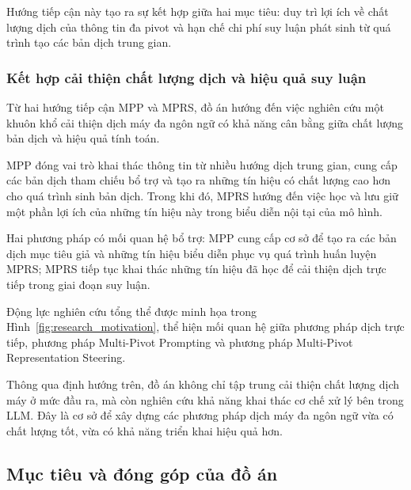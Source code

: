 Hướng tiếp cận này tạo ra sự kết hợp giữa hai mục tiêu: duy trì lợi ích về chất lượng dịch của thông tin đa pivot và hạn chế chi phí suy luận phát sinh từ quá trình tạo các bản dịch trung gian.

\subsubsection{Kết hợp cải thiện chất lượng dịch và hiệu quả suy luận}

Từ hai hướng tiếp cận MPP và MPRS, đồ án hướng đến việc nghiên cứu một khuôn khổ cải thiện dịch máy đa ngôn ngữ có khả năng cân bằng giữa chất lượng bản dịch và hiệu quả tính toán.

MPP đóng vai trò khai thác thông tin từ nhiều hướng dịch trung gian, cung cấp các bản dịch tham chiếu bổ trợ và tạo ra những tín hiệu có chất lượng cao hơn cho quá trình sinh bản dịch. Trong khi đó, MPRS hướng đến việc học và lưu giữ một phần lợi ích của những tín hiệu này trong biểu diễn nội tại của mô hình.

Hai phương pháp có mối quan hệ bổ trợ: MPP cung cấp cơ sở để tạo ra các bản dịch mục tiêu giả và những tín hiệu biểu diễn phục vụ quá trình huấn luyện MPRS; MPRS tiếp tục khai thác những tín hiệu đã học để cải thiện dịch trực tiếp trong giai đoạn suy luận.

Động lực nghiên cứu tổng thể được minh họa trong Hình~\ref{fig:research_motivation}, thể hiện mối quan hệ giữa phương pháp dịch trực tiếp, phương pháp Multi-Pivot Prompting và phương pháp Multi-Pivot Representation Steering.


Thông qua định hướng trên, đồ án không chỉ tập trung cải thiện chất lượng dịch máy ở mức đầu ra, mà còn nghiên cứu khả năng khai thác cơ chế xử lý bên trong LLM. Đây là cơ sở để xây dựng các phương pháp dịch máy đa ngôn ngữ vừa có chất lượng tốt, vừa có khả năng triển khai hiệu quả hơn.

\subsection{Mục tiêu và đóng góp của đồ án}
\label{sec:objectives_contributions}

